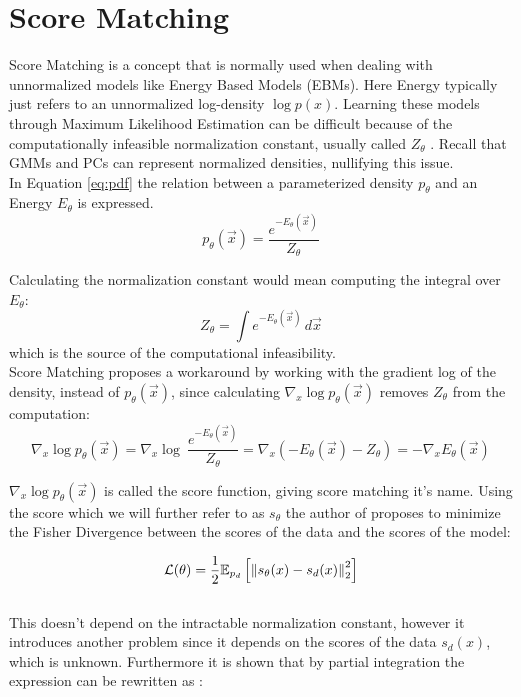 \section{Score Matching}
\label{sec:sm}

Score Matching \cite{sm} is a concept that is normally used when dealing with unnormalized models like Energy Based Models (EBMs). Here 
Energy typically just refers to an unnormalized log-density $\log p(x)$. 
Learning these models through Maximum Likelihood Estimation can be difficult because of the computationally infeasible normalization 
constant, usually called $Z_\theta$ \cite{sm}. Recall that GMMs and PCs can represent normalized densities, nullifying this issue. \\

In Equation \ref{eq:pdf} the relation between a parameterized density $p_\theta$ and an Energy $E_\theta$ is expressed. 
\begin{equation}
    \label{eq:pdf}
    p_\theta(\vec x) = \frac{e^{-E_\theta(\vec x)}}{Z_\theta}
\end{equation} 

Calculating the normalization constant would mean computing the integral over $E_\theta$: 
\[
    Z_\theta = \int e^{-E_\theta(\vec{x})} \, d\vec{x}
\]
which is the source of the computational infeasibility. \\

Score Matching proposes a workaround by working with the gradient log of the density, 
instead of $p_\theta(\vec x)$, since calculating $\nabla_x \log p_\theta(\vec x)$ removes $Z_\theta$ from the computation:
\[
    \nabla_x \log p_\theta(\vec x) = \nabla_x \log \ \frac{e^{- E_\theta(\vec x)}}{Z_\theta} = \nabla_x \left( - E_\theta(\vec x) - {Z_\theta} \right) = - \nabla_x E_\theta(\vec x)
\] 

$\nabla_x \log p_\theta(\vec x)$ is called the score function, giving score matching it's name.
Using the score which we will further refer to as $s_\theta$ the author of \cite{sm} proposes to minimize the Fisher Divergence between 
the scores of the data and the scores of the model: 

\begin{equation}
    \label{eq:fisher}
    \mathcal{L}(\theta) = \frac{1}{2} \mathbb{E}_{p_d} \left[ \left\lVert s_\theta(x) - s_d(x)\right\rVert^2_2 \right]
\end{equation} \\

This doesn't depend on the intractable normalization constant, however it introduces another problem since it depends on the scores of the data 
$s_d(x)$, which is unknown. Furthermore it is shown that by partial integration the expression can be rewritten as \cite{sm}:

